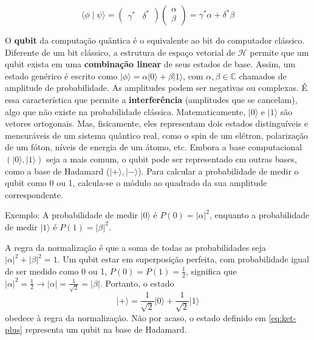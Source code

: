 \documentclass[12pt, a4paper]{article}
\newcommand{\ket}[1]{\lvert #1 \rangle}
\newcommand{\braket}[2]{\langle #1 \mid #2 \rangle}
\begin{document}
\[
\braket{\phi}{\psi} = 
\begin{pmatrix}
   \gamma^* & \delta^*
\end{pmatrix}
\begin{pmatrix}
    \alpha \\
    \beta
\end{pmatrix} =
\gamma^*\alpha + \delta^*\beta
\]

O \textbf{qubit} da computação quântica é o equivalente ao bit do computador clássico. Diferente de um bit clássico, a estrutura de espaço vetorial de $\mathcal{H}$ permite que um qubit exista em uma \textbf{combinação linear} de seus estados de base. Assim, um estado genérico é escrito como $\ket{\phi} = \alpha\ket{0} + \beta\ket{1}$, com $\alpha, \beta\in \mathbb{C}$ chamados de amplitude de probabilidade. As amplitudes podem ser negativas ou complexas. É essa característica que permite a \textbf{interferência} (amplitudes que se cancelam), algo que não existe na probabilidade clássica. Matematicamente, $\ket{0}$ e $\ket{1}$ são vetores ortogonais. Mas, fisicamente, eles representam dois estados distinguíveis e mensuráveis de um sistema quântico real, como o spin de um elétron, polarização de um fóton, níveis de energia de um átomo, etc. Embora a base computacional $(\ket{0}, \ket{1})$ seja a mais comum, o qubit pode ser representado em outras bases, como a base de Hadamard ($\ket{+}, \ket{-}$). Para calcular a probabilidade de medir o qubit como 0 ou 1, calcula-se o módulo ao quadrado da sua amplitude correspondente.


Exemplo: A probabilidade de medir $\ket{0}$ é $P(0) = |\alpha|^2$, enquanto a probabilidade de medir $\ket{1}$ é $P(1) = |\beta|^2$.

A regra da normalização é que a soma de todas as probabilidades seja \(|\alpha|^2 + |\beta|^2 = 1\). Um qubit estar em superposição perfeita, com probabilidade igual de ser medido como 0 ou 1, \(P(0) = P(1) = \frac{1}{2}\), significa que \(|\alpha|^2 = \frac{1}{2} \longrightarrow{|\alpha| = \frac{1}{\sqrt{2}} = |\beta|}\). Portanto, o estado
\begin{equation}
    \ket{+} = 
    \frac{1}{\sqrt{2}}\ket{0} + 
    \frac{1}{\sqrt{2}}\ket{1}
    \label{eq:ket-plus}
\end{equation}
obedece à regra da normalização. Não por acaso, o estado definido em \eqref{eq:ket-plus} representa um qubit na base de Hadamard.
\end{document}
